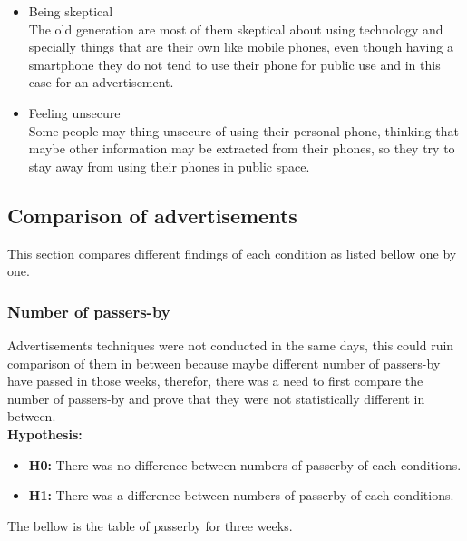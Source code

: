 \begin{enumerate}
\begin{itemize}
\item Being skeptical \\
The old generation are most of them skeptical about using technology and specially things that are their own like mobile phones, even though having a smartphone they do not tend to use their phone for public use and in this case for an advertisement. 

\item Feeling unsecure \\
Some people may thing unsecure of using their personal phone, thinking that maybe other information may be extracted from their phones, so they try to stay away from using their phones in public space. 

\fi

\end{itemize}

\end{enumerate}


\newpage
\subsection{Comparison of advertisements}
This section compares different findings of each condition as listed bellow one by one. 

\subsubsection {Number of passers-by}
Advertisements techniques were not conducted in the same days, this could ruin comparison of them in between because maybe different number of passers-by have passed in those weeks, therefor, there was a need to first compare the number of passers-by and prove that they were not statistically different in between. \\

\textbf{Hypothesis:}
\begin{itemize}
\item \textbf{H0:} There was no difference between numbers of passerby of each conditions.
\item \textbf{H1:} There was a difference between numbers of passerby of each conditions.
\end{itemize}

The bellow is the table of passerby for three weeks.

